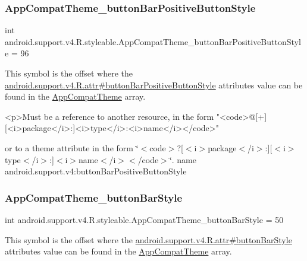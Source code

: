 \subsubsection{\texorpdfstring{App\+Compat\+Theme\+\_\+button\+Bar\+Positive\+Button\+Style}{AppCompatTheme\_buttonBarPositiveButtonStyle}}
{\footnotesize\ttfamily int android.\+support.\+v4.\+R.\+styleable.\+App\+Compat\+Theme\+\_\+button\+Bar\+Positive\+Button\+Style = 96\hspace{0.3cm}{\ttfamily [static]}}

This symbol is the offset where the \hyperlink{classandroid_1_1support_1_1v4_1_1R_1_1attr_a777a1df76dd19b37852b5b0b343933dc}{android.\+support.\+v4.\+R.\+attr\#button\+Bar\+Positive\+Button\+Style} attribute\textquotesingle{}s value can be found in the \hyperlink{classandroid_1_1support_1_1v4_1_1R_1_1styleable_ac07ebbe62ed977f6dcaadc6397840ace}{App\+Compat\+Theme} array.

\begin{DoxyVerb}      <p>Must be a reference to another resource, in the form "<code>@[+][<i>package</i>:]<i>type</i>:<i>name</i></code>"
\end{DoxyVerb}
 or to a theme attribute in the form \char`\"{}$<$code$>$?\mbox{[}$<$i$>$package$<$/i$>$\+:\mbox{]}\mbox{[}$<$i$>$type$<$/i$>$\+:\mbox{]}$<$i$>$name$<$/i$>$$<$/code$>$\char`\"{}.  name android.\+support.\+v4\+:button\+Bar\+Positive\+Button\+Style \mbox{\label{classandroid_1_1support_1_1v4_1_1R_1_1styleable_a833b29c75685e8a0ac239143d3e6fb6e}} 
\subsubsection{\texorpdfstring{App\+Compat\+Theme\+\_\+button\+Bar\+Style}{AppCompatTheme\_buttonBarStyle}}
{\footnotesize\ttfamily int android.\+support.\+v4.\+R.\+styleable.\+App\+Compat\+Theme\+\_\+button\+Bar\+Style = 50\hspace{0.3cm}{\ttfamily [static]}}

This symbol is the offset where the \hyperlink{classandroid_1_1support_1_1v4_1_1R_1_1attr_ab6043a58f9feddd5e50a5dff20e3c18c}{android.\+support.\+v4.\+R.\+attr\#button\+Bar\+Style} attribute\textquotesingle{}s value can be found in the \hyperlink{classandroid_1_1support_1_1v4_1_1R_1_1styleable_ac07ebbe62ed977f6dcaadc6397840ace}{App\+Compat\+Theme} array.

